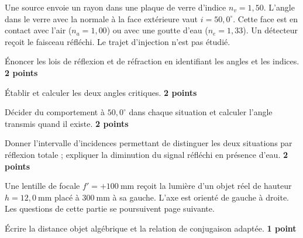 \label{ch01-ex-DS}
Une source envoie un rayon dans une plaque de verre d'indice $n_v=1{,}50$. L'angle dans le verre avec la normale à la face extérieure vaut $i=50{,}0^\circ$. Cette face est en contact avec l'air ($n_a=1{,}00$) ou avec une goutte d'eau ($n_e=1{,}33$). Un détecteur reçoit le faisceau réfléchi. Le trajet d'injection n'est pas étudié.
\begin{questions}
\item Énoncer les lois de réflexion et de réfraction en identifiant les angles et les indices. \textbf{2 points}
\item Établir et calculer les deux angles critiques. \textbf{2 points}
\item Décider du comportement à $50{,}0^\circ$ dans chaque situation et calculer l'angle transmis quand il existe. \textbf{2 points}
\item Donner l'intervalle d'incidences permettant de distinguer les deux situations par réflexion totale ; expliquer la diminution du signal réfléchi en présence d'eau. \textbf{2 points}
\end{questions}
Une lentille de focale $f'=+100\ \mathrm{mm}$ reçoit la lumière d'un objet réel de hauteur $h=12{,}0\ \mathrm{mm}$ placé à $300\ \mathrm{mm}$ à sa gauche. L'axe est orienté de gauche à droite. Les questions de cette partie se poursuivent page suivante.
\begin{questions}
\item Écrire la distance objet algébrique et la relation de conjugaison adaptée. \textbf{1 point}
\end{questions}

